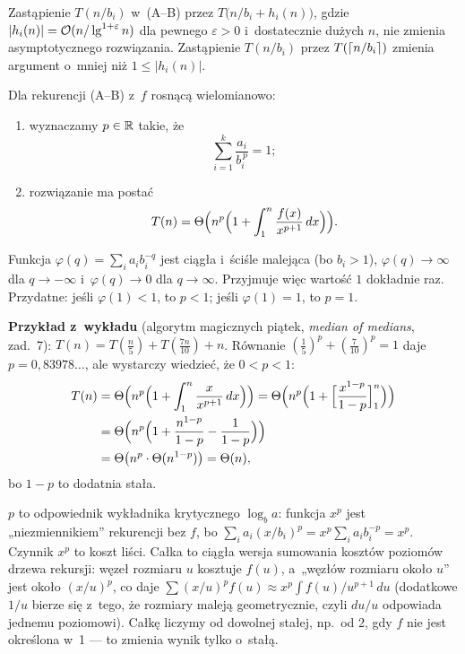 \documentclass[11pt]{article}
\begin{document}
\begin{fakt}\label{fakt:akra-h}
Zastąpienie $T(n/b_i)$ w~(A--B) przez $T\bigl(n/b_i+h_i(n)\bigr)$, gdzie
$|h_i(n)|=\mathcal{O}(n/\operatorname{lg}^{1+\varepsilon}n)$ dla pewnego $\varepsilon>0$
i~dostatecznie dużych $n$, nie zmienia asymptotycznego rozwiązania.
Zastąpienie $T(n/b_i)$ przez $T(\left\lceil n/b_i \right\rceil)$ zmienia argument o~mniej
niż $1\le|h_i(n)|$.
\end{fakt}

\begin{twierdzenie}\label{tw:akra}
Dla rekurencji (A--B) z~$f$ rosnącą wielomianowo:
\begin{enumerate}
\item wyznaczamy $p\in\mathbb{R}$ takie, że
\[
\sum_{i=1}^k\frac{a_i}{b_i^{\,p}}=1;
\]
\item rozwiązanie ma postać
\[
T(n)=\Theta\Bigl(n^p\Bigl(1+\int_1^n\frac{f(x)}{x^{p+1}}\,dx\Bigr)\Bigr).
\]
\end{enumerate}
\end{twierdzenie}

\begin{uwaga}
Funkcja $\varphi(q)=\sum_ia_ib_i^{-q}$ jest ciągła i~ściśle malejąca (bo
$b_i>1$), $\varphi(q)\to\infty$ dla $q\to-\infty$ i~$\varphi(q)\to0$ dla
$q\to\infty$. Przyjmuje więc wartość $1$ dokładnie raz. Przydatne: jeśli
$\varphi(1)<1$, to $p<1$; jeśli $\varphi(1)=1$, to $p=1$.
\end{uwaga}

\textbf{Przykład z~wykładu} (algorytm magicznych piątek, \emph{median of
medians}, zad.~7): $T(n)=T(\frac n5)+T(\frac{7n}{10})+n$. Równanie
$(\frac15)^p+(\frac7{10})^p=1$ daje $p=0{,}83978\ldots$, ale wystarczy
wiedzieć, że $0<p<1$:
\begin{align*}
T(n)&=\Theta\Bigl(n^p\Bigl(1+\int_1^n\frac{x}{x^{p+1}}\,dx\Bigr)\Bigr)
=\Theta\Bigl(n^p\Bigl(1+\Bigl[\frac{x^{1-p}}{1-p}\Bigr]_1^n\Bigr)\Bigr)\\
&=\Theta\Bigl(n^p\Bigl(1+\frac{n^{1-p}}{1-p}-\frac1{1-p}\Bigr)\Bigr)\\
&=\Theta\bigl(n^p\cdot\Theta(n^{1-p})\bigr)=\Theta(n),
\end{align*}
bo $1-p$ to dodatnia stała.

\begin{intuicja}
$p$ to odpowiednik wykładnika krytycznego $\log_ba$: funkcja $x^p$ jest
„niezmiennikiem” rekurencji bez $f$, bo
$\sum_ia_i(x/b_i)^p=x^p\sum_ia_ib_i^{-p}=x^p$.
Czynnik $x^p$ to koszt liści. Całka to ciągła wersja sumowania kosztów
poziomów drzewa rekursji: węzeł rozmiaru $u$ kosztuje $f(u)$, a~„węzłów
rozmiaru około $u$” jest około $(x/u)^p$, co daje
$\sum(x/u)^pf(u)\approx x^p\int f(u)/u^{p+1}\,du$ (dodatkowe $1/u$ bierze się
z~tego, że rozmiary maleją geometrycznie, czyli $du/u$ odpowiada jednemu
poziomowi). Całkę liczymy od dowolnej stałej, np.\ od 2, gdy $f$ nie jest
określona w~1 --- to zmienia wynik tylko o~stałą.
\end{intuicja}
\end{document}
